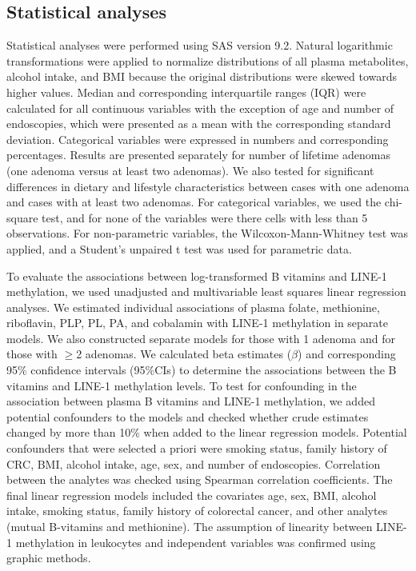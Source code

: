 \subsection{Statistical analyses} %
\noindent Statistical analyses were performed using SAS version 9.2. Natural logarithmic transformations were applied to normalize distributions of all plasma metabolites, alcohol intake, and BMI because the original distributions were skewed towards higher values. Median and corresponding interquartile ranges (IQR) were calculated for all continuous variables with the exception of age and number of endoscopies, which were presented as a mean with the corresponding standard deviation. Categorical variables were expressed in numbers and corresponding percentages. Results are presented separately for number of lifetime adenomas (one adenoma versus at least two adenomas). We also tested for significant differences in dietary and lifestyle characteristics between cases with one adenoma and cases with at least two adenomas. For categorical variables, we used the chi-square test, and for none of the variables were there cells with less than 5 observations. For non-parametric variables, the Wilcoxon-Mann-Whitney 
test was applied, and a Student's unpaired t test was used for parametric data.

\noindent To evaluate the associations between log-transformed B vitamins and LINE-1 methylation, we used unadjusted and multivariable least squares linear regression analyses. We estimated individual associations of plasma folate, methionine, riboflavin, PLP, PL, PA, and cobalamin with LINE-1 methylation in separate models. We also constructed separate models for those with 1 adenoma and for those with $\geq$2 adenomas. We calculated beta estimates ($\beta$) and corresponding 95\% confidence intervals (95\%CIs) to determine the associations between the B vitamins and LINE-1 methylation levels. To test for confounding in the association between plasma B vitamins and LINE-1 methylation, we added potential confounders to the models and checked whether crude estimates changed by more than 10\% when added to the linear regression models. Potential confounders that were selected a priori were smoking status, family history of CRC, BMI, alcohol intake, age, sex, and number of endoscopies. Correlation between the 
analytes was checked using Spearman correlation coefficients. The final linear regression models included the covariates age, sex, BMI, alcohol intake, smoking status, family history of colorectal cancer, and other analytes (mutual B-vitamins and methionine). The assumption of linearity between LINE-1 methylation in leukocytes and independent variables was confirmed using graphic methods.

